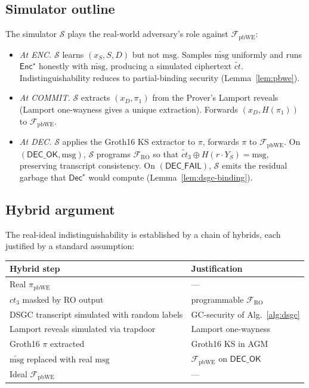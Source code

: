 \documentclass[11pt]{article}
\newcommand{\msg}{\mathrm{msg}}
\newcommand{\Enc}{\mathsf{Enc}}
\newcommand{\Dec}{\mathsf{Dec}}
\begin{document}
\subsection{Simulator outline}

The simulator $\mathcal{S}$ plays the real-world adversary's role
against $\mathcal{F}_{\mathrm{pbWE}}$:

\begin{itemize}
  \item \emph{At ENC.} $\mathcal{S}$ learns $(x_S, S, D)$ but not
    $\msg$. Samples $\widetilde{\msg}$ uniformly and runs
    $\Enc^\star$ honestly with $\widetilde{\msg}$, producing a
    simulated ciphertext $\widetilde{ct}$. Indistinguishability
    reduces to partial-binding security
    (Lemma~\ref{lem:pbwe}).
  \item \emph{At COMMIT.} $\mathcal{S}$ extracts
    $(x_D, \pi_1)$ from the Prover's Lamport reveals (Lamport
    one-wayness gives a unique extraction). Forwards
    $(x_D, H(\pi_1))$ to $\mathcal{F}_{\mathrm{pbWE}}$.
  \item \emph{At DEC.} $\mathcal{S}$ applies the Groth16 KS extractor
    to $\pi$, forwards $\pi$ to $\mathcal{F}_{\mathrm{pbWE}}$. On
    $(\mathsf{DEC\_OK}, \msg)$, $\mathcal{S}$ programs
    $\mathcal{F}_{\mathrm{RO}}$ so that $\widetilde{ct}_3 \oplus H(r \cdot Y_S) = \msg$,
    preserving transcript consistency. On
    $(\mathsf{DEC\_FAIL})$, $\mathcal{S}$ emits the residual garbage
    that $\Dec^\star$ would compute (Lemma~\ref{lem:dsgc-binding}).
\end{itemize}

\subsection{Hybrid argument}

The real-ideal indistinguishability is established by a chain of
hybrids, each justified by a standard assumption:

\begin{center}\small
\renewcommand{\arraystretch}{1.15}
\begin{tabular}{@{}l l@{}}
\toprule
\textbf{Hybrid step} & \textbf{Justification} \\
\midrule
Real $\pi_{\mathrm{pbWE}}$ & --- \\
$ct_3$ masked by RO output & programmable $\mathcal{F}_{\mathrm{RO}}$ \\
DSGC transcript simulated with random labels & GC-security of Alg.~\ref{alg:dsgc} \\
Lamport reveals simulated via trapdoor & Lamport one-wayness \\
Groth16 $\pi$ extracted & Groth16 KS in AGM \\
$\widetilde{\msg}$ replaced with real $\msg$ & $\mathcal{F}_{\mathrm{pbWE}}$ on $\mathsf{DEC\_OK}$ \\
Ideal $\mathcal{F}_{\mathrm{pbWE}}$ & --- \\
\bottomrule
\end{tabular}
\end{center}
\end{document}
